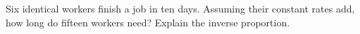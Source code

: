 Six identical workers finish a job in ten days. Assuming their constant rates add, how long do fifteen workers need? Explain the inverse proportion.
